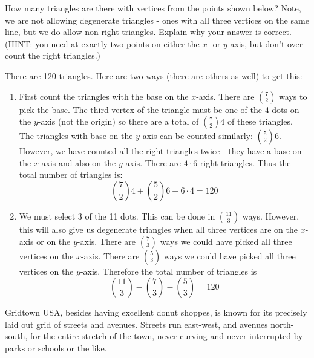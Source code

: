 \documentclass[10pt]{exam}
\begin{document}
\begin{questions}
\question[6] How many triangles are there with vertices from the points shown below?  Note, we are not allowing degenerate triangles - ones with all three vertices on the same line, but we do allow non-right triangles.  Explain why your answer is correct. (HINT: you need at exactly two points on either the $x$- or $y$-axis, but don't over-count the right triangles.)

\begin{center}
\end{center}

\begin{solution}
  There are 120 triangles.  Here are two ways (there are others as well) to get this:
  
  \begin{enumerate}
    \item First count the triangles with the base on the $x$-axis.  There are ${7 \choose 2}$ ways to pick the base.  The third vertex of the triangle must be one of the 4 dots on the $y$-axis (not the origin) so there are a total of ${7 \choose 2}4$ of these triangles.  The triangles with base on the $y$ axis can be counted similarly: ${5 \choose 2}6$.  However, we have counted all the right triangles twice - they have a base on the $x$-axis and also on the $y$-axis.  There are $4 \cdot 6$ right triangles.  Thus the total number of triangles is:
    \[{7 \choose 2}4 + {5 \choose 2}6 - 6\cdot 4 = 120\]
    \item We must select 3 of the 11 dots.  This can be done in ${11 \choose 3}$ ways.  However, this will also give us degenerate triangles when all three vertices are on the $x$-axis or on the $y$-axis.  There are ${7 \choose 3}$ ways we could have picked all three vertices on the $x$-axis.  There are ${5 \choose 3}$ ways we could have picked all three vertices on the $y$-axis.  Therefore the total number of triangles is
    \[{11 \choose 3} - {7 \choose 3} - {5 \choose 3} = 120\]
  \end{enumerate}

\end{solution}



\question[8] Gridtown USA, besides having excellent donut shoppes, is known for its precisely laid out grid of streets and avenues.  Streets run east-west, and avenues north-south, for the entire stretch of the town, never curving and never interrupted by parks or schools or the like.


\end{questions}
\end{document}
